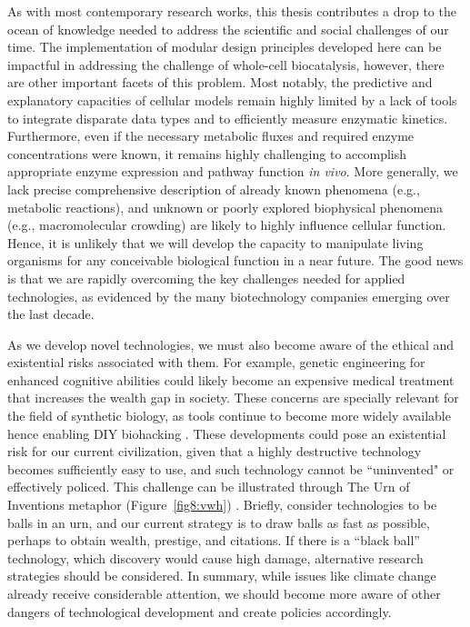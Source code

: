 As with most contemporary research works, this thesis contributes a drop to the ocean of knowledge needed to address the scientific and social challenges of our time.
The implementation of modular design principles developed here can be impactful in addressing the challenge of whole-cell biocatalysis, however, there are other important facets of this problem.
Most notably, the predictive and explanatory capacities of cellular models remain highly limited by a lack of tools to integrate disparate data types and to efficiently measure enzymatic kinetics.
Furthermore, even if the necessary metabolic fluxes and required enzyme concentrations were known, it remains highly challenging to accomplish appropriate enzyme expression and pathway function \textit{in vivo}.
More generally, we lack precise comprehensive description of already known phenomena (e.g., metabolic reactions), and unknown or poorly explored biophysical phenomena (e.g., macromolecular crowding) are likely to highly influence cellular function.
Hence, it is unlikely that we will develop the capacity to manipulate living organisms for any conceivable biological function in a near future.
The good news is that we are rapidly overcoming the key challenges needed for applied technologies, as evidenced by the many biotechnology companies emerging over the last decade.

As we develop novel technologies, we must also become aware of the ethical and existential risks associated with them.
For example, genetic engineering for enhanced cognitive abilities could likely become an expensive medical treatment that increases the wealth gap in society.
These concerns are specially relevant for the field of synthetic biology, as tools continue to become more widely available hence enabling DIY biohacking \citep{bennett2009}.
These developments could pose an existential risk for our current civilization, given that a highly destructive technology becomes sufficiently easy to use,  and such technology cannot be ``uninvented" or effectively policed.
This challenge can be illustrated through The Urn of Inventions metaphor (Figure~\ref{fig8:vwh}) \citep{bostrom2019}. %
Briefly, consider technologies to be balls in an urn, and our current strategy is to draw balls as fast as possible, perhaps to obtain wealth, prestige, and citations.
If there is a ``black ball'' technology, which discovery would cause high damage, alternative research strategies should be considered.
In summary, while issues like climate change already receive considerable attention, we should become more aware of other dangers of technological development and create policies accordingly.

